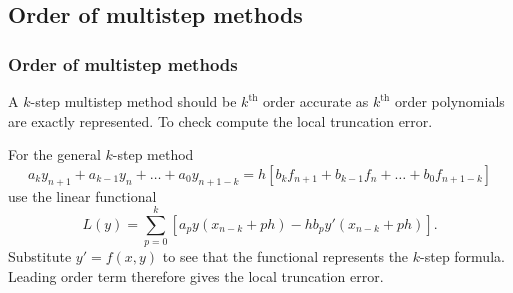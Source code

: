 \documentclass{beamer}
\begin{document}
\subsection{Order of multistep methods}

\begin{frame}
  \frametitle{Order of multistep methods}

  A $k$-step multistep method should be $k^{\text{th}}$ order accurate
  as $k^{\text{th}}$ order polynomials are exactly represented.  To
  check compute the local truncation error. \pause

  \vspace{1ex}

  For the general $k$-step method
  \begin{equation*}
    a_k y_{n+1} + a_{k-1} y_n + \dots + a_0 y_{n+1-k} = h \left[ b_k
      f_{n+1} + b_{k-1} f_n + \dots + b_0 f_{n+1-k} \right]
  \end{equation*}
  use the linear functional
  \begin{equation*}
    L(y) = \sum_{p=0}^k \left[ a_p y(x_{n-k} + p h) - h b_p y'(x_{n-k}
      + ph) \right].
  \end{equation*} \pause
  Substitute $y' = f(x, y)$ to see that the functional represents the
  $k$-step formula. Leading order term therefore gives the local
  truncation error.


\end{frame}
\end{document}
